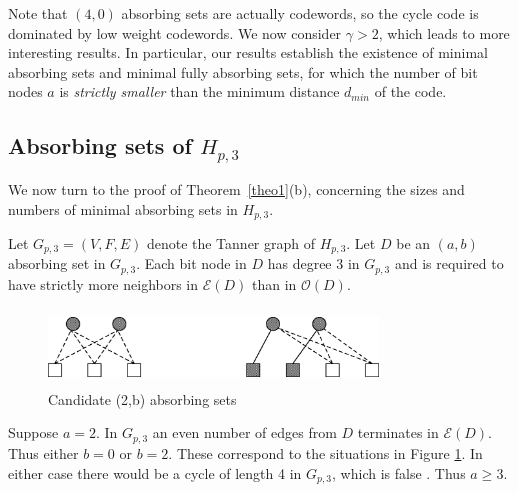 Note that $(4,0)$ absorbing sets are actually codewords, so  the
cycle code is dominated by low weight codewords. We now consider
$\gamma
> 2$, which leads to more interesting results. In particular, our results establish the
existence of minimal absorbing sets and minimal fully absorbing
sets, for which the number of bit nodes $a$ is \emph{strictly
smaller} than the minimum distance $d_{min}$ of the code.

\subsection{Absorbing sets of $H_{p,3}$}\label{theo12}

We now turn to the proof of Theorem~\ref{theo1}(b), concerning the
sizes and numbers of minimal absorbing sets in $H_{p,3}$.


Let $G_{p,3}=(V,F,E)$ denote the Tanner graph of $H_{p,3}$. Let
$D$ be an $(a,b)$ absorbing set in $G_{p,3}$. Each bit node in $D$
has degree $3$ in $G_{p,3}$ and is required to have strictly more
neighbors in $\mathcal{E}(D)$ than in $\mathcal{O}(D)$.

\begin{figure}
\center\includegraphics[width=3.45in,height=0.8in]{fig07.eps}
\caption{Candidate (2,b) absorbing sets}\label{Fig07}
\end{figure}
Suppose $a=2$. In $G_{p,3}$ an even number of edges from $D$
terminates in $\mathcal{E}(D)$. Thus either $b=0$ or $b=2$. These
correspond to the situations in Figure \ref{Fig07}. In either case
there would be a cycle of length 4 in $G_{p,3}$, which is false
\cite{fan}. Thus $a\geq 3$.

